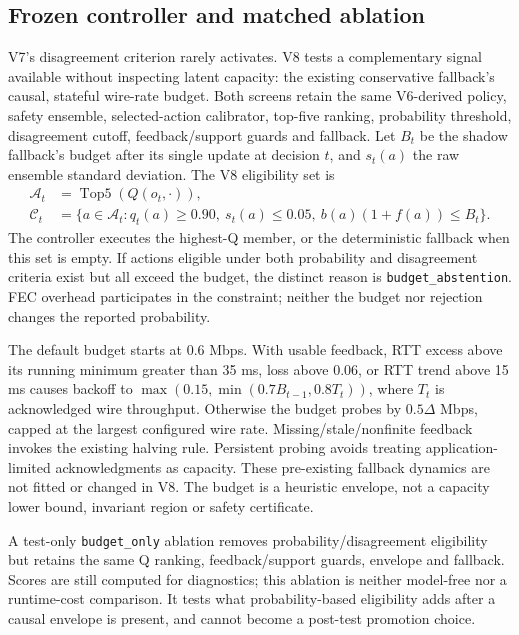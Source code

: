\documentclass[10pt]{article}
\begin{document}
\subsection{Frozen controller and matched ablation}
V7's disagreement criterion rarely activates. V8 tests a complementary signal available without inspecting latent capacity: the existing conservative fallback's causal, stateful wire-rate budget. Both screens retain the same V6-derived policy, safety ensemble, selected-action calibrator, top-five ranking, probability threshold, disagreement cutoff, feedback/support guards and fallback. Let $B_t$ be the shadow fallback's budget after its single update at decision $t$, and $s_t(a)$ the raw ensemble standard deviation. The V8 eligibility set is
\begin{equation}
\begin{aligned}
\mathcal{A}_t &= \operatorname{Top5}(Q(o_t,\cdot)),\\
\mathcal{C}_t &= \{a\in\mathcal{A}_t:
 q_t(a)\geq 0.90,\ s_t(a)\leq 0.05,\ b(a)(1+f(a))\leq B_t\}.
\end{aligned}
\end{equation}
The controller executes the highest-Q member, or the deterministic fallback when this set is empty. If actions eligible under both probability and disagreement criteria exist but all exceed the budget, the distinct reason is \texttt{budget\_abstention}. FEC overhead participates in the constraint; neither the budget nor rejection changes the reported probability.

The default budget starts at 0.6 Mbps. With usable feedback, RTT excess above its running minimum greater than 35 ms, loss above 0.06, or RTT trend above 15 ms causes backoff to $\max(0.15,\min(0.7B_{t-1},0.8T_t))$, where $T_t$ is acknowledged wire throughput. Otherwise the budget probes by $0.5\Delta$ Mbps, capped at the largest configured wire rate. Missing/stale/nonfinite feedback invokes the existing halving rule. Persistent probing avoids treating application-limited acknowledgments as capacity. These pre-existing fallback dynamics are not fitted or changed in V8. The budget is a heuristic envelope, not a capacity lower bound, invariant region or safety certificate.

A test-only \texttt{budget\_only} ablation removes probability/disagreement eligibility but retains the same Q ranking, feedback/support guards, envelope and fallback. Scores are still computed for diagnostics; this ablation is neither model-free nor a runtime-cost comparison. It tests what probability-based eligibility adds after a causal envelope is present, and cannot become a post-test promotion choice.
\end{document}
